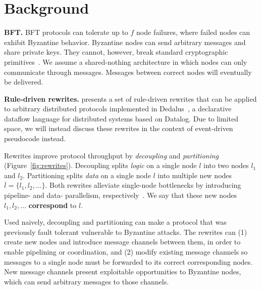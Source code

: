 \section{Background}
\label{sec:background}

\textbf{BFT.}
BFT protocols can tolerate up to $f$ node failures, where failed nodes can exhibit Byzantine behavior. 
Byzantine nodes can send arbitrary messages and share private keys. They cannot, however, break standard cryptographic primitives~\cite{pbft}.
We assume a shared-nothing architecture in which nodes can only communicate through messages.
Messages between correct nodes will eventually be delivered.

\textbf{Rule-driven rewrites.}
\sigmodpaper{} presents a set of rule-driven rewrites that can be applied to arbitrary distributed protocols implemented in Dedalus~\cite{dedalus}, a declarative dataflow language for distributed systems based on Datalog.
Due to limited space, we will instead discuss these rewrites in the context of event-driven pseudocode instead.

Rewrites improve protocol throughput by \emph{decoupling} and \emph{partitioning}~\cite{compartmentalized} (Figure~\ref{fig:rewrites}).
Decoupling splits \emph{logic} on a single node $l$ into two nodes $l_1$ and $l_2$.
Partitioning splits \emph{data} on a single node $l$ into multiple new nodes $\overline{l} = \{l_1, l_2, \ldots\}$.
Both rewrites alleviate single-node bottlenecks by introducing pipeline- and data- parallelism, respectively~\cite{autocomp}.
We say that these new nodes $l_1, l_2, \ldots$ \textbf{correspond} to $l$.

Used naively, decoupling and partitioning can make a protocol that was previously fault tolerant vulnerable to Byzantine attacks.
The rewrites can (1) create new nodes and introduce message channels between them, in order to enable pipelining or coordination, and (2) modify existing message channels so messages to a single node must be forwarded to its correct corresponding nodes.
New message channels present exploitable opportunities to Byzantine nodes, which can send arbitrary messages to those channels.


